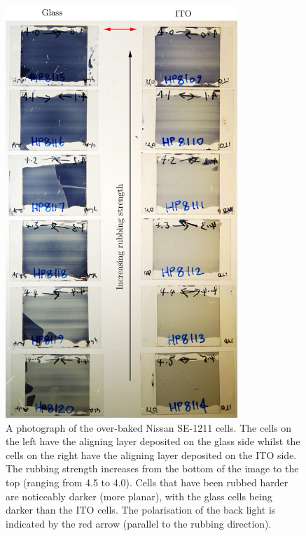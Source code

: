 \begin{figure}
\begin{center}
\includegraphics[width=0.78\textwidth]{Figures/Pretilt/cells}
\end{center}
\caption[Photograph of cells fabricated using over-baked Nissan SE-1211]{\label{fig:cells}{A photograph of the over-baked Nissan SE-1211 cells. The cells on the left have the aligning layer deposited on the glass side whilst the cells on the right have the aligning layer deposited on the ITO side. The rubbing strength increases from the bottom of the image to the top (ranging from 4.5 to 4.0). Cells that have been rubbed harder are noticeably darker (more planar), with the glass cells being darker than the ITO cells}. The polarisation of the back light is indicated by the red arrow (parallel to the rubbing direction).}
\end{figure}

